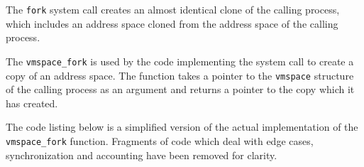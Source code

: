 \documentclass[shortabstract, english]{iithesis}
\begin{document}
The \texttt{fork} \cite{freebsd:fork} system call creates an almost identical clone of the calling
process, which includes an address space cloned from the address space of the
calling process.

The \texttt{vmspace_fork} is used by the code implementing the system
call to create a copy of an address space. The function takes a pointer to the
\texttt{vmspace} structure of the calling process as an argument and
returns a pointer to the copy which it has created.

The code listing below is a simplified version of the actual implementation of
the \texttt{vmspace_fork} function. Fragments of code which deal with
edge cases, synchronization and accounting have been removed for clarity.

\end{document}
